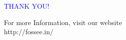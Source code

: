 \documentclass[17pt]{beamer}
\begin{document}
\begin{frame}

  \begin{block}{}
  \begin{center}
  \textcolor{blue}{\Large THANK YOU!} 
  \end{center}
  \end{block}
\begin{block}{}
  \begin{center}
    For more Information, visit our website\\
    {http://fossee.in/}
  \end{center}  
  \end{block}
\end{frame}
\end{document}
